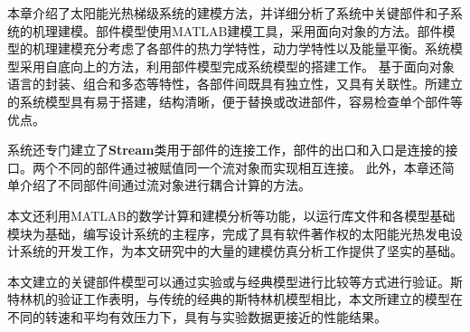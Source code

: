本章介绍了太阳能光热梯级系统的建模方法，并详细分析了系统中关键部件和子系统的机理建模。部件模型使用MATLAB建模工具，采用面向对象的方法。部件模型的机理建模充分考虑了各部件的热力学特性，动力学特性以及能量平衡。系统模型采用自底向上的方法，利用部件模型完成系统模型的搭建工作。
基于面向对象语言的封装、组合和多态等特性，各部件间既具有独立性，又具有关联性。所建立的系统模型具有易于搭建，结构清晰，便于替换或改进部件，容易检查单个部件等优点。

系统还专门建立了\textbf{Stream}类用于部件的连接工作，部件的出口和入口是连接的接口。两个不同的部件通过被赋值同一个流对象而实现相互连接。
此外，本章还简单介绍了不同部件间通过流对象进行耦合计算的方法。

本文还利用MATLAB的数学计算和建模分析等功能，以运行库文件和各模型基础模块为基础，编写设计系统的主程序，完成了具有软件著作权的太阳能光热发电设计系统的开发工作，为本文研究中的大量的建模仿真分析工作提供了坚实的基础。

本文建立的关键部件模型可以通过实验或与经典模型进行比较等方式进行验证。斯特林机的验证工作表明，与传统的经典的斯特林机模型相比，本文所建立的模型在不同的转速和平均有效压力下，具有与实验数据更接近的性能结果。